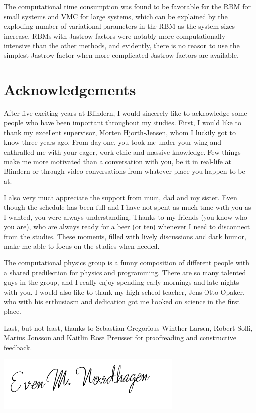The computational time consumption was found to be favorable for the RBM for small systems and VMC for large systems, which can be explained by the exploding number of variational parameters in the RBM as the system sizes increase. RBMs with Jastrow factors were notably more computationally intensive than the other methods, and evidently, there is no reason to use the simplest Jastrow factor when more complicated Jastrow factors are available.

\thispagestyle{empty}
\cleardoublepage

\section*{Acknowledgements}
After five exciting years at Blindern, I would sincerely like to acknowledge some people who have been important throughout my studies. First, I would like to thank my excellent supervisor, Morten Hjorth-Jensen, whom I luckily got to know three years ago. From day one, you took me under your wing and enthralled me with your eager, work ethic and massive knowledge. Few things make me more motivated than a conversation with you, be it in real-life at Blindern or through video conversations from whatever place you happen to be at.

I also very much appreciate the support from mum, dad and my sister. Even though the schedule has been full and I have not spent as much time with you as I wanted, you were always understanding. Thanks to my friends (you know who you are), who are always ready for a beer (or ten) whenever I need to disconnect from the studies. These moments, filled with lively discussions and dark humor, make me able to focus on the studies when needed.

The computational physics group is a funny composition of different people with a shared predilection for physics and programming. There are so many talented guys in the group, and I really enjoy spending early mornings and late nights with you. I would also like to thank my high school teacher, Jens Otto Opaker, who with his enthusiasm and dedication got me hooked on science in the first place.

Last, but not least, thanks to Sebastian Gregorious Winther-Larsen, Robert Solli, Marius Jonsson and Kaitlin Rose Preusser for proofreading and constructive feedback.\vspace{3cm}

\includegraphics[scale=0.7]{../Images/signature.png}

